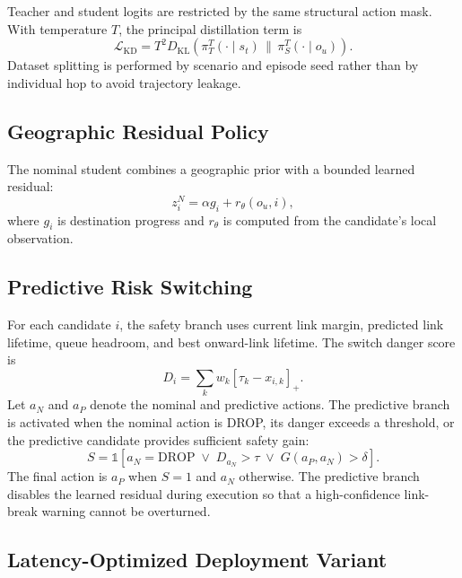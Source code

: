\documentclass[preprint,12pt]{elsarticle}
\begin{document}
Teacher and student logits are restricted by the same structural action mask. With temperature $T$, the principal distillation term is
\begin{equation}
\mathcal{L}_{\mathrm{KD}}=T^2D_{\mathrm{KL}}
\left(\pi_T^T(\cdot\mid s_t)\,\|\,\pi_S^T(\cdot\mid o_u)\right).
\end{equation}
Dataset splitting is performed by scenario and episode seed rather than by individual hop to avoid trajectory leakage.

\subsection{Geographic Residual Policy}

The nominal student combines a geographic prior with a bounded learned residual:
\begin{equation}
z_i^{N}=\alpha g_i+r_{\theta}(o_u,i),
\end{equation}
where $g_i$ is destination progress and $r_{\theta}$ is computed from the candidate's local observation.

\subsection{Predictive Risk Switching}

For each candidate $i$, the safety branch uses current link margin, predicted link lifetime, queue headroom, and best onward-link lifetime. The switch danger score is
\begin{equation}
D_i=\sum_{k}w_k[\tau_k-x_{i,k}]_+.
\end{equation}
Let $a_N$ and $a_P$ denote the nominal and predictive actions. The predictive branch is activated when the nominal action is DROP, its danger exceeds a threshold, or the predictive candidate provides sufficient safety gain:
\begin{equation}
S=\mathbb{1}\!\left[a_N=\mathrm{DROP}\;\lor\;D_{a_N}>\tau\;\lor\;
G(a_P,a_N)>\delta\right].
\end{equation}
The final action is $a_P$ when $S=1$ and $a_N$ otherwise. The predictive branch disables the learned residual during execution so that a high-confidence link-break warning cannot be overturned.

\subsection{Latency-Optimized Deployment Variant}
\label{sec:fastswitchglobe}
\end{document}
